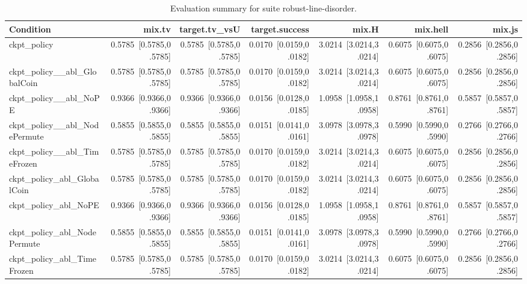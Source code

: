\begin{table}[t]
\centering
\caption{Evaluation summary for suite robust-line-disorder.}
\label{tab:eval_robust-line-disorder}
\begin{tabular}{lrrrrrr}
\toprule
Condition & mix.tv & target.tv\_vsU & target.success & mix.H & mix.hell & mix.js \\
\midrule
ckpt\_policy & 0.5785~[0.5785,0.5785] & 0.5785~[0.5785,0.5785] & 0.0170~[0.0159,0.0182] & 3.0214~[3.0214,3.0214] & 0.6075~[0.6075,0.6075] & 0.2856~[0.2856,0.2856] \\
ckpt\_policy\_\_abl\_GlobalCoin & 0.5785~[0.5785,0.5785] & 0.5785~[0.5785,0.5785] & 0.0170~[0.0159,0.0182] & 3.0214~[3.0214,3.0214] & 0.6075~[0.6075,0.6075] & 0.2856~[0.2856,0.2856] \\
ckpt\_policy\_\_abl\_NoPE & 0.9366~[0.9366,0.9366] & 0.9366~[0.9366,0.9366] & 0.0156~[0.0128,0.0185] & 1.0958~[1.0958,1.0958] & 0.8761~[0.8761,0.8761] & 0.5857~[0.5857,0.5857] \\
ckpt\_policy\_\_abl\_NodePermute & 0.5855~[0.5855,0.5855] & 0.5855~[0.5855,0.5855] & 0.0151~[0.0141,0.0161] & 3.0978~[3.0978,3.0978] & 0.5990~[0.5990,0.5990] & 0.2766~[0.2766,0.2766] \\
ckpt\_policy\_\_abl\_TimeFrozen & 0.5785~[0.5785,0.5785] & 0.5785~[0.5785,0.5785] & 0.0170~[0.0159,0.0182] & 3.0214~[3.0214,3.0214] & 0.6075~[0.6075,0.6075] & 0.2856~[0.2856,0.2856] \\
ckpt\_policy\_abl\_GlobalCoin & 0.5785~[0.5785,0.5785] & 0.5785~[0.5785,0.5785] & 0.0170~[0.0159,0.0182] & 3.0214~[3.0214,3.0214] & 0.6075~[0.6075,0.6075] & 0.2856~[0.2856,0.2856] \\
ckpt\_policy\_abl\_NoPE & 0.9366~[0.9366,0.9366] & 0.9366~[0.9366,0.9366] & 0.0156~[0.0128,0.0185] & 1.0958~[1.0958,1.0958] & 0.8761~[0.8761,0.8761] & 0.5857~[0.5857,0.5857] \\
ckpt\_policy\_abl\_NodePermute & 0.5855~[0.5855,0.5855] & 0.5855~[0.5855,0.5855] & 0.0151~[0.0141,0.0161] & 3.0978~[3.0978,3.0978] & 0.5990~[0.5990,0.5990] & 0.2766~[0.2766,0.2766] \\
ckpt\_policy\_abl\_TimeFrozen & 0.5785~[0.5785,0.5785] & 0.5785~[0.5785,0.5785] & 0.0170~[0.0159,0.0182] & 3.0214~[3.0214,3.0214] & 0.6075~[0.6075,0.6075] & 0.2856~[0.2856,0.2856] \\
\bottomrule
\end{tabular}
\end{table}
